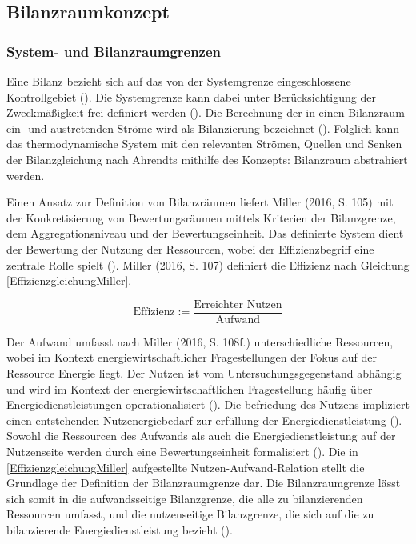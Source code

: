 \subsection{Bilanzraumkonzept}


\subsubsection{System- und Bilanzraumgrenzen}
Eine Bilanz bezieht sich auf das von der Systemgrenze eingeschlossene Kontrollgebiet (\cite[Kapitel 1.5]{Ahrendts.2014}). 
Die Systemgrenze kann dabei unter Berücksichtigung der Zweckmäßigkeit frei definiert werden (\cite[Kapitel 1.5]{Ahrendts.2014}).
Die Berechnung der in einen Bilanzraum ein- und austretenden Ströme wird als Bilanzierung bezeichnet (\cite[S. 65]{Rönsch.2015}).
Folglich kann das thermodynamische System mit den relevanten Strömen, Quellen und Senken der Bilanzgleichung nach Ahrendts mithilfe des Konzepts: 
Bilanzraum abstrahiert werden. 

Einen Ansatz zur Definition von Bilanzräumen liefert Miller (2016, S. 105) mit der Konkretisierung von Bewertungsräumen mittels Kriterien der Bilanzgrenze, dem 
Aggregationsniveau und der Bewertungseinheit. Das definierte System dient der Bewertung der Nutzung der Ressourcen, wobei der Effizienzbegriff eine zentrale Rolle spielt 
(\cite[S. 107]{Miller.2016}).
Miller (2016, S. 107) definiert die Effizienz nach Gleichung \eqref{EffizienzgleichungMiller}.

\begin{equation}
    \text{Effizienz} := \frac{\text{Erreichter Nutzen}}{\text{Aufwand}}
    \label{EffizienzgleichungMiller}
\end{equation}

Der Aufwand umfasst nach Miller (2016, S. 108f.) unterschiedliche Ressourcen, wobei im Kontext energiewirtschaftlicher Fragestellungen der Fokus auf der Ressource Energie liegt.
Der Nutzen ist vom Untersuchungsgegenstand abhängig und wird im Kontext der energiewirtschaftlichen Fragestellung häufig über Energiedienstleistungen operationalisiert (\cite[S. 107]{Miller.2016}). 
Die befriedung des Nutzens impliziert einen entstehenden Nutzenergiebedarf zur erfüllung der Energiedienstleistung (\cite[S. 107]{Miller.2016}).
Sowohl die Ressourcen des Aufwands als auch die Energiedienstleistung auf der Nutzenseite werden durch eine Bewertungseinheit formalisiert (\cite{Miller.2016}).
Die in \eqref{EffizienzgleichungMiller} aufgestellte Nutzen-Aufwand-Relation stellt die Grundlage der Definition der Bilanzraumgrenze dar.
Die Bilanzraumgrenze lässt sich somit in die aufwandsseitige Bilanzgrenze, die alle zu bilanzierenden Ressourcen umfasst, und die nutzenseitige Bilanzgrenze, 
die sich auf die zu bilanzierende Energiedienstleistung bezieht (\cite[S. 111]{Miller.2016}).


